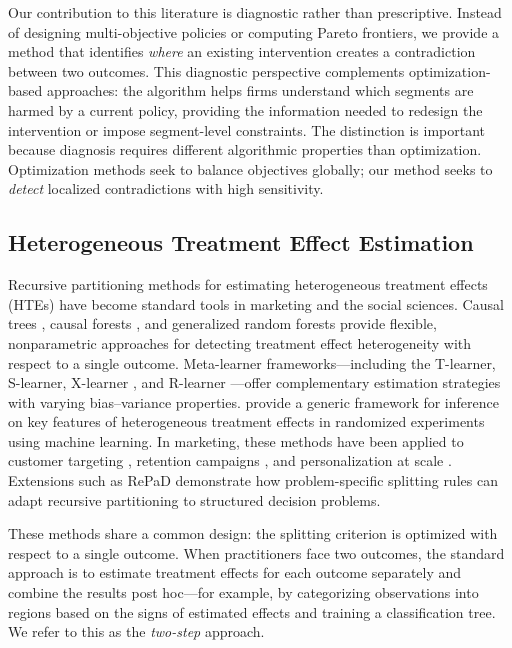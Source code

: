 \documentclass[11pt,letterpaper,english]{article}
\theoremstyle{definition}
\theoremstyle{definition}
\begin{document}
\begin{bibunit}
Our contribution to this literature is diagnostic rather than prescriptive. Instead of designing multi-objective policies or computing Pareto frontiers, we provide a method that identifies \emph{where} an existing intervention creates a contradiction between two outcomes. This diagnostic perspective complements optimization-based approaches: the algorithm helps firms understand which segments are harmed by a current policy, providing the information needed to redesign the intervention or impose segment-level constraints. The distinction is important because diagnosis requires different algorithmic properties than optimization. Optimization methods seek to balance objectives globally; our method seeks to \emph{detect} localized contradictions with high sensitivity.

\subsection{Heterogeneous Treatment Effect Estimation}
\label{sec:lit-hte}

Recursive partitioning methods for estimating heterogeneous treatment effects (HTEs) have become standard tools in marketing and the social sciences. Causal trees \citep{athey2016recursive}, causal forests \citep{wager2018estimation}, and generalized random forests \citep{athey2019grf} provide flexible, nonparametric approaches for detecting treatment effect heterogeneity with respect to a single outcome. Meta-learner frameworks---including the T-learner, S-learner, X-learner \citep{kunzel2019metalearners}, and R-learner \citep{nie2021quasioracle}---offer complementary estimation strategies with varying bias--variance properties. \citet{chernozhukov2025generic} provide a generic framework for inference on key features of heterogeneous treatment effects in randomized experiments using machine learning. In marketing, these methods have been applied to customer targeting \citep{simester2020targeting, hitsch2024heterogeneous}, retention campaigns \citep{ascarza2018retention}, and personalization at scale \citep{lemmens2025personalization}. Extensions such as RePaD \citep{barzegary2022recursive} demonstrate how problem-specific splitting rules can adapt recursive partitioning to structured decision problems.

These methods share a common design: the splitting criterion is optimized with respect to a single outcome. When practitioners face two outcomes, the standard approach is to estimate treatment effects for each outcome separately and combine the results post hoc---for example, by categorizing observations into regions based on the signs of estimated effects and training a classification tree. We refer to this as the \emph{two-step} approach.


\end{bibunit}
\end{document}

